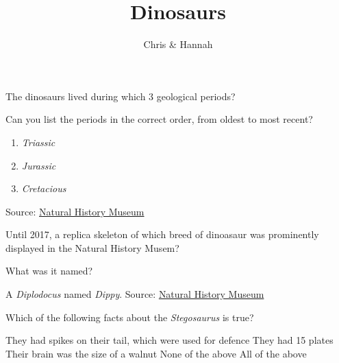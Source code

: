 \documentclass[answers]{exam}
\title{Dinosaurs\vspace{-2ex}}
\author{Chris \& Hannah\vspace{-2ex}}
\begin{document}
\maketitle
\vspace{5mm}

\begin{questions}

    \question The dinosaurs lived during which 3 geological periods?
    
    \begin{parts}
        \bonuspart Can you list the periods in the correct order, from oldest to most recent?
    \end{parts}
    
    \begin{solution}
        \begin{enumerate}
            \item \emph{Triassic}
            \item \emph{Jurassic}
            \item \emph{Cretacious}
        \end{enumerate}
        Source: \href{https://www.nhm.ac.uk/discover/when-did-dinosaurs-live.html?gclid=EAIaIQobChMIgJG-vbzv6QIVlO7tCh12ggzwEAAYASAAEgLPCfD_BwE}{Natural History Museum}
    \end{solution}

    \question Until 2017, a replica skeleton of which breed of dinoasaur was prominently displayed in the Natural History Musem?

    \begin{parts}
        \bonuspart What was it named?
    \end{parts}

    \begin{solution}
        A \emph{Diplodocus} named \emph{Dippy}.
        \linebreak
        Source: \href{https://www.nhm.ac.uk/discover/dippy-the-dino-star.html}{Natural History Museum}
    \end{solution}


    \question Which of the following facts about the \emph{Stegosaurus} is true?
    
    \begin{choices}
        \CorrectChoice They had spikes on their tail, which were used for defence
        \choice They had 15 plates
        \choice Their brain was the size of a walnut
        \choice None of the above
        \choice All of the above
    \end{choices}


\end{questions}
\end{document}
